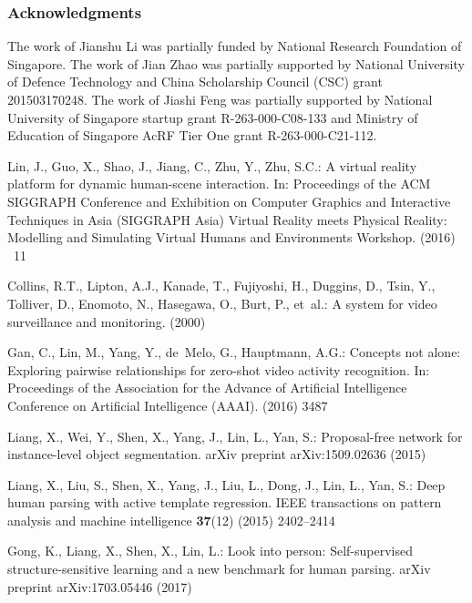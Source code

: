 \documentclass[10pt, letterpaper]{article}
\begin{document}
\subsubsection*{Acknowledgments}
The work of Jianshu Li was partially funded by National Research Foundation of Singapore. The work of Jian Zhao was partially supported by National University of Defence Technology and China Scholarship Council (CSC) grant 201503170248. The work of Jiashi Feng was partially supported by National University of Singapore startup grant R-263-000-C08-133 and Ministry of Education of Singapore AcRF Tier One grant R-263-000-C21-112.


\begin{thebibliography}{10}
Lin, J., Guo, X., Shao, J., Jiang, C., Zhu, Y., Zhu, S.C.:
\newblock A virtual reality platform for dynamic human-scene interaction.
\newblock In: Proceedings of the ACM SIGGRAPH Conference and Exhibition on
  Computer Graphics and Interactive Techniques in Asia (SIGGRAPH Asia) Virtual
  Reality meets Physical Reality: Modelling and Simulating Virtual Humans and
  Environments Workshop. (2016) ~11

Collins, R.T., Lipton, A.J., Kanade, T., Fujiyoshi, H., Duggins, D., Tsin, Y.,
  Tolliver, D., Enomoto, N., Hasegawa, O., Burt, P.,  et~al.:
\newblock A system for video surveillance and monitoring.
\newblock (2000)

Gan, C., Lin, M., Yang, Y., de~Melo, G., Hauptmann, A.G.:
\newblock Concepts not alone: Exploring pairwise relationships for zero-shot
  video activity recognition.
\newblock In: Proceedings of the Association for the Advance of Artificial
  Intelligence Conference on Artificial Intelligence (AAAI). (2016)  3487

Liang, X., Wei, Y., Shen, X., Yang, J., Lin, L., Yan, S.:
\newblock Proposal-free network for instance-level object segmentation.
\newblock arXiv preprint arXiv:1509.02636 (2015)

Liang, X., Liu, S., Shen, X., Yang, J., Liu, L., Dong, J., Lin, L., Yan, S.:
\newblock Deep human parsing with active template regression.
\newblock IEEE transactions on pattern analysis and machine intelligence
  \textbf{37}(12) (2015)  2402--2414

Gong, K., Liang, X., Shen, X., Lin, L.:
\newblock Look into person: Self-supervised structure-sensitive learning and a
  new benchmark for human parsing.
\newblock arXiv preprint arXiv:1703.05446 (2017)


\end{thebibliography}
\end{document}
